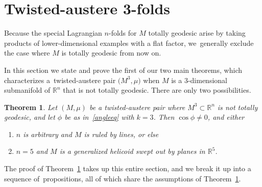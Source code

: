 \documentclass[pdftex]{sigma}
\def\R{\mathbb{R}}
\newtheorem{Theorem}{Theorem}[section]
\numberwithin{equation}{section}
\begin{document}
\section{Twisted-austere 3-folds} \label{sec:tw3folds}

Because the special Lagrangian $n$-folds for $M$ totally geodesic arise by taking products of lower-dimensional examples with a flat factor, we~generally exclude the case where $M$ is totally geodesic from now on.

In this section we state and prove the first of our two main theorems, which characterizes a~twisted-austere pair $\big(M^3, \mu\big)$ when $M$ is a $3$-dimensional submanifold of $\R^n$ that is not totally geodesic. There are only two possibilities.

\begin{Theorem} \label{theoremone}
Let $(M,\mu)$ be a twisted-austere pair where $M^3 \subset \R^n$ is \emph{not totally geodesic}, and let $\phi$ be as in~\eqref{angleeq} with $k=3$.
Then $\cos \phi \ne 0$, and either
\begin{enumerate}[$(i)$]\itemsep=0pt
\item $n$ is arbitrary and $M$ is {ruled by lines}, or else
\item $n=5$ and $M$ is a {generalized helicoid swept out by planes in $\R^5$}.
\end{enumerate}
\end{Theorem}

The proof of Theorem~\ref{theoremone} takes up this entire section, and we break it up into a sequence of~pro\-positions, all of which share the assumptions of Theorem~\ref{theoremone}.
\end{document}
